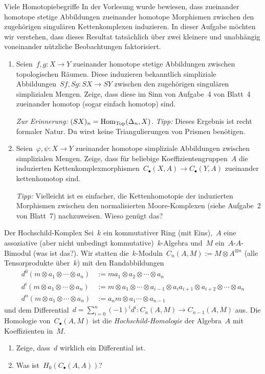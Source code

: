 \documentclass{uebblatt}
\begin{document}
\begin{aufgabe}{Viele Homotopiebegriffe}
In der Vorlesung wurde bewiesen, dass zueinander homotope stetige Abbildungen
zueinander homotope Morphismen zwischen den zugehörigen singulären
Kettenkomplexen induzieren. In dieser Aufgabe möchten wir verstehen, dass
dieses Resultat tatsächlich über zwei kleinere und unabhängig voneinander
nützliche Beobachtungen faktorisiert.
\begin{enumerate}
\item Seien~$f, g : X \to Y$ zueinander homotope stetige Abbildungen zwischen
topologischen Räumen. Diese induzieren bekanntlich simpliziale Abbildungen~$Sf,
Sg : SX \to SY$ zwischen den zugehörigen singulären simplizialen Mengen. Zeige,
dass diese im Sinn von Aufgabe~4 von Blatt~4 zueinander homotop (sogar einfach
homotop) sind.

\emph{Zur Erinnerung:} $(SX)_n = \mathrm{Hom}_{\mathrm{Top}}(\Delta_n,X)$.
\emph{Tipp:} Dieses Ergebnis ist recht formaler Natur. Du wirst keine
Triangulierungen von Prismen benötigen.

\item Seien~$\varphi, \psi : X \to Y$ zueinander homotope simpliziale
Abbildungen zwischen simplizialen Mengen. Zeige, dass für beliebige
Koeffizientengruppen~$A$ die induzierten
Kettenkomplexmorphismen~$C_\bullet(X,A) \to C_\bullet(Y,A)$ zueinander
kettenhomotop sind.

\emph{Tipp:} Vielleicht ist es einfacher, die Kettenhomotopie der induzierten
Morphismen zwischen den normalisierten Moore-Komplexen (siehe Aufgabe~2 von
Blatt~7) nachzuweisen. Wieso genügt das?
\end{enumerate}
\end{aufgabe}

\newpage

\begin{aufgabe}{Der Hochschild-Komplex}
Sei~$k$ ein kommutativer Ring (mit Eins),~$A$ eine assoziative (aber nicht
unbedingt kommutative)~$k$-Algebra und~$M$ ein~$A$-$A$-Bimodul (was ist das?).
Wir statten die~$k$-Moduln~$C_n(A,M) := M \otimes A^{\otimes n}$ (alle
Tensorprodukte über~$k$) mit den Randabbildungen
\begin{align*}
  d^0(m \otimes a_1 \otimes \cdots \otimes a_n) &:=
    ma_1 \otimes a_2 \otimes \cdots \otimes a_n \\
  d^i(m \otimes a_1 \otimes \cdots \otimes a_n) &:=
    m \otimes a_1 \otimes \cdots \otimes a_{i-1} \otimes a_i a_{i+1} \otimes
    a_{i+2} \otimes \cdots \otimes a_n \\
  d^n(m \otimes a_1 \otimes \cdots \otimes a_n) &:=
    a_n m \otimes a_1 \cdots \otimes a_{n-1}
\end{align*}
und dem Differential~$d = \sum_{i=0}^n (-1)^i d^i : C_n(A,M) \to C_{n-1}(A,M)$
aus. Die Homologie von~$C_\bullet(A,M)$ ist die \emph{Hochschild-Homologie} der
Algebra~$A$ mit Koeffizienten in~$M$.
\begin{enumerate}
\item Zeige, dass~$d$ wirklich ein Differential ist.
\item Was ist~$H_0(C_\bullet(A,A))$?
\end{enumerate}
\end{aufgabe}
\end{document}
